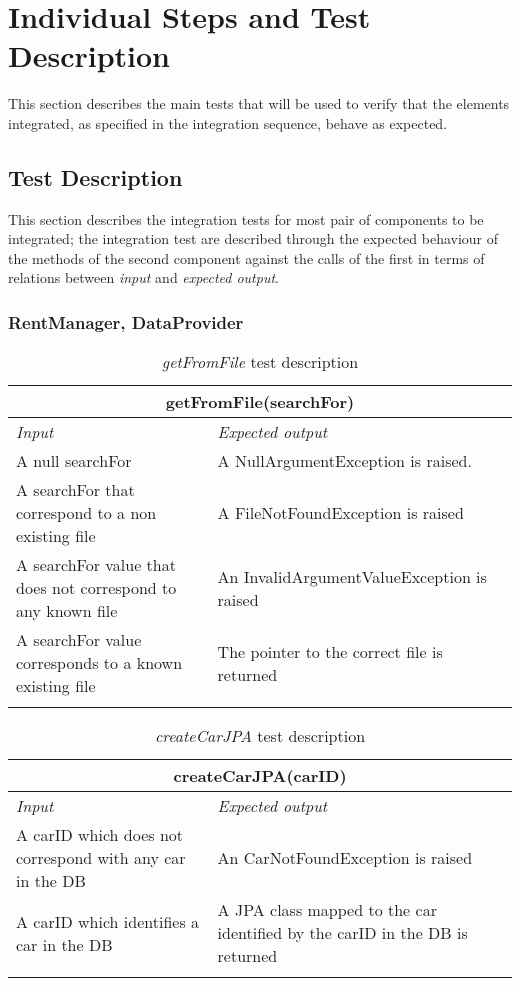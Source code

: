 \section{Individual Steps and Test Description}

This section describes the main tests that will be used to verify that the elements integrated, as specified in the integration sequence, behave as expected. 

\subsection{Test Description}

This section describes the integration tests for most pair of components to be integrated; the integration test are described through the expected behaviour of the methods of the second component against the calls of the first in terms of relations between \emph{input} and \emph{expected output}.

\subsubsection{RentManager, DataProvider}

\begin{longtable}{p{0.4\linewidth}p{0.6\linewidth}}
\multicolumn{2}{c}{\textbf{getFromFile(searchFor)}} \\
\toprule
\emph{Input} & \emph{Expected output} \\
\midrule
A null searchFor & A NullArgumentException is raised.\\
\midrule
A searchFor that correspond to a non existing file & A FileNotFoundException is raised \\
\midrule
A searchFor value that does not correspond to any known file & An InvalidArgumentValueException is raised \\
\midrule
A searchFor value corresponds to a known existing file & The pointer to the correct file is returned \\
\bottomrule
\caption{\emph{getFromFile} test description}
\end{longtable}

\begin{longtable}{p{0.4\linewidth}p{0.6\linewidth}}
\multicolumn{2}{c}{\textbf{createCarJPA(carID)}} \\
\toprule
\emph{Input} & \emph{Expected output} \\
\midrule
A carID which does not correspond with any car in the DB & An CarNotFoundException is raised \\
\midrule
A carID which identifies a car in the DB & A JPA class mapped to the car identified by the carID in the DB is returned \\
\bottomrule
\caption{\label{tbl:createCarJPA}\emph{createCarJPA} test description}
\end{longtable}


